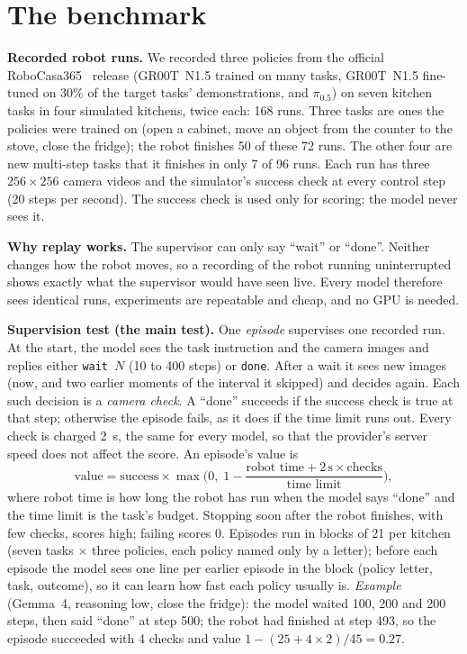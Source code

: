 \documentclass[10pt,twocolumn,letterpaper]{article}
\begin{document}
\section{The benchmark}
\label{sec:benchmark}
\textbf{Recorded robot runs.} We recorded three policies from the official RoboCasa365~\cite{robocasa} release
(GR00T~N1.5 trained on many tasks, GR00T~N1.5 fine-tuned on 30\% of the target tasks' demonstrations, and
$\pi_{0.5}$) on seven kitchen tasks in four simulated kitchens, twice each: 168 runs. Three tasks are ones the
policies were trained on (open a cabinet, move an object from the counter to the stove, close the fridge); the
robot finishes 50 of these 72 runs. The other four are new multi-step tasks that it finishes in only 7 of 96 runs.
Each run has three $256\times256$ camera videos and the simulator's success check at every control step (20 steps per
second). The success check is used only for scoring; the model never sees it.

\textbf{Why replay works.} The supervisor can only say ``wait'' or ``done''. Neither changes how the robot moves, so a
recording of the robot running uninterrupted shows exactly what the supervisor would have seen live. Every model
therefore sees identical runs, experiments are repeatable and cheap, and no GPU is needed.

\textbf{Supervision test (the main test).} One \emph{episode} supervises one recorded run. At the start, the model
sees the task instruction and the camera images and replies either \texttt{wait $N$} (10 to 400 steps) or
\texttt{done}. After a wait it sees new images (now, and two earlier moments of the interval it skipped) and decides
again. Each such decision is a \emph{camera check}. A ``done'' succeeds if the success check is true at that step;
otherwise the episode fails, as it does if the time limit runs out. Every check is charged 2~s, the same for every
model, so that the provider's server speed does not affect the score. An episode's value is
\begin{equation*}
\text{value} = \text{success} \times \max\!\Big(0,\; 1 - \frac{\text{robot time} + 2\,\text{s} \times \text{checks}}{\text{time limit}}\Big),
\end{equation*}
where robot time is how long the robot has run when the model says ``done'' and the time limit is the task's
budget. Stopping soon after the robot finishes, with few checks, scores high; failing scores 0. Episodes run in blocks of 21 per kitchen (seven
tasks $\times$ three policies, each policy named only by a letter); before each episode the model sees one line per
earlier episode in the block (policy letter, task, outcome), so it can learn how fast each policy usually is.
\emph{Example} (Gemma~4, reasoning low, close the fridge): the model waited 100, 200 and 200 steps, then said ``done''
at step 500; the robot had finished at step 493, so the episode succeeded with 4 checks and value
$1 - (25 + 4\times2)/45 = 0.27$.
\end{document}
